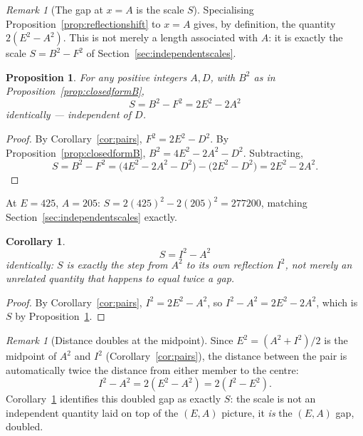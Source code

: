 \documentclass[12pt]{article}
\newtheorem{proposition}[theorem]{Proposition}
\newtheorem{corollary}[theorem]{Corollary}
\theoremstyle{remark}
\newtheorem{remark}[theorem]{Remark}
\begin{document}
\begin{remark}[The gap at $x=A$ is the scale $S$]
Specialising Proposition~\ref{prop:reflectionshift} to $x=A$ gives, by
definition, the quantity $2(E^2-A^2)$. This is not merely a length
associated with $A$: it is exactly the scale $S=B^2-F^2$ of
Section~\ref{sec:independentscales}.
\end{remark}

\begin{proposition}\label{prop:Sclosedform}
For any positive integers $A,D$, with $B^2$ as in
Proposition~\ref{prop:closedformB},
\[
S = B^2-F^2 = 2E^2-2A^2
\]
identically --- independent of $D$.
\end{proposition}

\begin{proof}
By Corollary~\ref{cor:pairs}, $F^2=2E^2-D^2$. By
Proposition~\ref{prop:closedformB}, $B^2=4E^2-2A^2-D^2$. Subtracting,
\[
S = B^2-F^2 = \bigl(4E^2-2A^2-D^2\bigr)-\bigl(2E^2-D^2\bigr) = 2E^2-2A^2 .
\]
\end{proof}

At $E=425$, $A=205$: $S=2(425)^2-2(205)^2=277200$, matching
Section~\ref{sec:independentscales} exactly.

\begin{corollary}\label{cor:Sstep}
\[
S = I^2-A^2
\]
identically: $S$ is exactly the step from $A^2$ to its own reflection
$I^2$, not merely an unrelated quantity that happens to equal twice a
gap.
\end{corollary}

\begin{proof}
By Corollary~\ref{cor:pairs}, $I^2=2E^2-A^2$, so $I^2-A^2=2E^2-2A^2$,
which is $S$ by Proposition~\ref{prop:Sclosedform}.
\end{proof}

\begin{remark}[Distance doubles at the midpoint]
Since $E^2=(A^2+I^2)/2$ is the midpoint of $A^2$ and $I^2$
(Corollary~\ref{cor:pairs}), the distance between the pair is
automatically twice the distance from either member to the centre:
\[
I^2-A^2 = 2(E^2-A^2) = 2(I^2-E^2) .
\]
Corollary~\ref{cor:Sstep} identifies this doubled gap as exactly $S$:
the scale is not an independent quantity laid on top of the $(E,A)$
picture, it \emph{is} the $(E,A)$ gap, doubled.
\end{remark}
\end{document}
